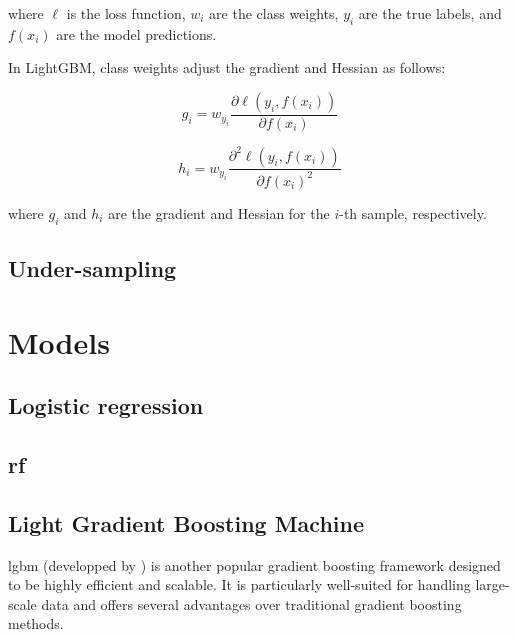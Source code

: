 \documentclass[12pt]{article}
\begin{document}
{where \( \ell \) is the loss function, \( w_i \) are the class weights, \( y_i \) are the true labels, and \( f(x_i) \) are the model predictions.
 
In LightGBM, class weights adjust the gradient and Hessian as follows:
 
\begin{equation}
g_i = w_{y_i} \frac{\partial \ell(y_i, f(x_i))}{\partial f(x_i)}
\end{equation}
 
\begin{equation}
h_i = w_{y_i} \frac{\partial^2 \ell(y_i, f(x_i))}{\partial f(x_i)^2}
\end{equation}
 
where \( g_i \) and \( h_i \) are the gradient and Hessian for the \( i \)-th sample, respectively.


}


\newpage
\subsection{Under-sampling}



\newpage
\section{Models}


\newpage 
\subsection{Logistic regression}\label{subsec:Logistic regression}


\newpage
\subsection{\acrlong{rf}}



\newpage
\subsection{Light Gradient Boosting Machine}
\acrlong{lgbm} (developped by \cite{LightGBM}) is another popular gradient boosting framework designed to be highly efficient and scalable. It is particularly well-suited for handling large-scale data and offers several advantages over traditional gradient boosting methods.
 
\end{document}
